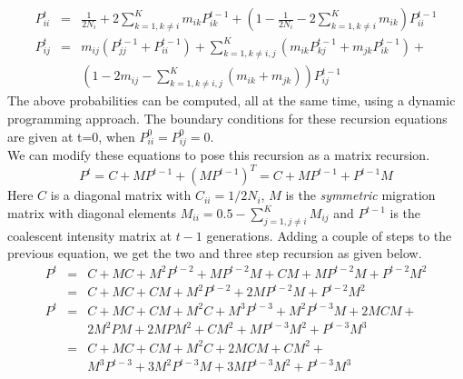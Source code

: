 \documentclass[11pt]{article}
\begin{document}
\begin{eqnarray}
P_{ii}^t &=& \frac{1}{2N_i} + 2\sum_{k=1, k \neq i}^{K} m_{ik}P_{ik}^{t-1} + (1-\frac{1}{2N_i}-2\sum_{k=1, k \neq i}^K m_{ik}) P_{ii}^{t-1} \\
P_{ij}^t &=& m_{ij}(P_{jj}^{t-1}+P_{ii}^{t-1})+\sum_{k=1,k\neq i,j}^K (m_{ik}P_{kj}^{t-1}+m_{jk}P_{ik}^{t-1})+ \nonumber \\
         & & (1-2m_{ij}-\sum_{k=1,k\neq i,j}^K (m_{ik}+m_{jk}))P_{ij}^{t-1}
\end{eqnarray}
The above probabilities can be computed, all at the same time, using a dynamic programming approach. The boundary conditions for these recursion
equations are given at t=0, when $P_{ii}^0 = P_{ij}^0 = 0$.\\
We can modify these equations to pose this recursion as a matrix recursion. 
\begin{equation}
P^t = C + MP^{t-1} + (MP^{t-1})^T = C + MP^{t-1} + P^{t-1}M 
\end{equation}
Here $C$ is a diagonal matrix with $C_{ii} = 1/2N_i$, $M$ is the \textit{symmetric} migration matrix with diagonal elements $M_{ii} = 0.5 - \sum_{j=1, j \neq i}^K M_{ij}$ and
$P^{t-1}$ is the coalescent intensity matrix at $t-1$ generations. Adding a couple of steps to the previous equation, we get the two and three step recursion as given below.
\begin{eqnarray}
P^t &=& C + MC + M^2P^{t-2} + MP^{t-2}M + CM + MP^{t-2}M + P^{t-2}M^2 \nonumber \\
       &=& C + MC + CM + M^2P^{t-2} + 2MP^{t-2}M + P^{t-2}M^2 \\
P^t &=& C + MC +CM + M^2C + M^3P^{t-3} + M^2P^{t-3}M + 2MCM +\nonumber \\
       &  &  2M^2PM+ 2MPM^2 + CM^2+MP^{t-3}M^2+P^{t-3}M^3 \nonumber \\
       &=& C + MC + CM + M^2C + 2MCM + CM^2 + \nonumber \\
       &  &  M^3P^{t-3} + 3M^2P^{t-3}M + 3MP^{t-3}M^2 + P^{t-3}M^3
\end{eqnarray}
\end{document}
